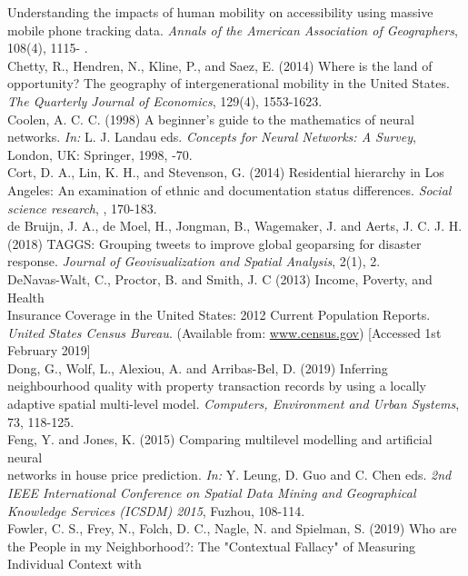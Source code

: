 \documentclass[a4paper,UKenglish]{lipics-v2018}
\begin{document}
\indent Understanding the impacts of human mobility on accessibility using massive mobile \indent phone tracking data. \textit{Annals of the American Association of Geographers}, 108(4), 1115-
.\\
Chetty, R., Hendren, N., Kline, P., and Saez, E. (2014) Where is the land of opportunity? 
\indent The geography of intergenerational mobility in the United States. \textit{The Quarterly Journal
\indent of Economics}, 129(4), 1553-1623. \\
Coolen, A. C. C. (1998) A beginner’s guide to the mathematics of neural networks. \textit{In:} L. 
\indent J. Landau eds. \textit{Concepts for Neural Networks: A Survey}, London, UK: Springer, 1998,
-70. \\
Cort, D. A., Lin, K. H., and Stevenson, G. (2014) Residential hierarchy in Los Angeles: 
\indent An examination of ethnic and documentation status differences. \textit{Social science research}, 
, 170-183.\\
de Bruijn, J. A., de Moel, H., Jongman, B., Wagemaker, J. and Aerts, J. C. J. H. (2018)
\indent TAGGS: Grouping tweets to improve global geoparsing for disaster response. \textit{Journal \indent of Geovisualization and Spatial Analysis}, 2(1), 2.\\
DeNavas-Walt, C., Proctor, B. and Smith, J. C (2013) Income, Poverty, and Health \\
\indent Insurance Coverage in the United States: 2012 Current Population Reports. \textit{ United 
\indent States Census Bureau}. (Available from: \href{http://www.census.gov/prod/2013pubs/p60-245.pdf}{www.census.gov}) [Accessed 1st February 2019] \\
Dong, G., Wolf, L., Alexiou, A. and Arribas-Bel, D. (2019) Inferring neighbourhood quality 
\indent with  property transaction records by using a locally adaptive spatial multi-level model. 
\indent \textit{Computers, Environment and Urban Systems}, 73, 118-125. \\
Feng, Y. and Jones, K. (2015) Comparing multilevel modelling and artificial neural \\
\indent networks in house price prediction. \textit{In:} Y. Leung, D. Guo and C. Chen eds. \textit{ 2nd IEEE 
\indent International Conference on Spatial Data Mining and Geographical Knowledge Services 
\indent (ICSDM) 2015}, Fuzhou, 108-114. \\
Fowler, C. S., Frey, N., Folch, D. C., Nagle, N. and Spielman, S. (2019) Who are the People 
\indent in my Neighborhood?: The "Contextual Fallacy" of Measuring Individual Context with 
\end{document}
